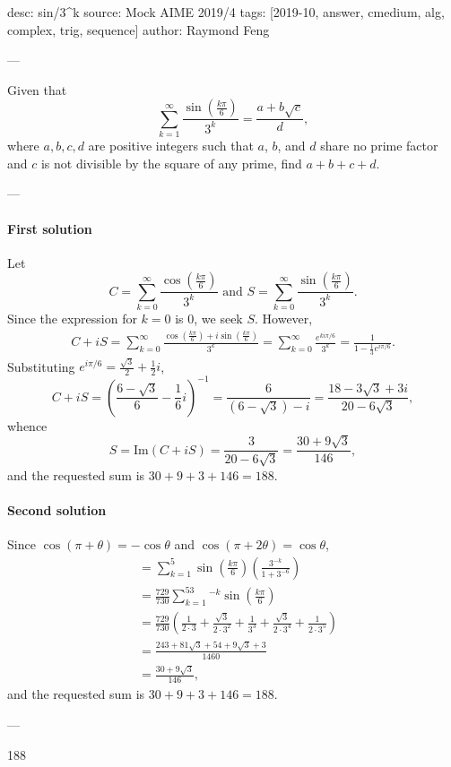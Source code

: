 desc: sin/3^k
source: Mock AIME 2019/4
tags: [2019-10, answer, cmedium, alg, complex, trig, sequence]
author: Raymond Feng

---

Given that \[\sum_{k=1}^\infty\frac{\sin(\frac{k\pi}6)}{3^k}=\frac{a+b\sqrt c}d,\]
where $a,b,c,d$ are positive integers such that $a$, $b$, and $d$ share no prime factor and $c$ is not divisible by the square of any prime, find $a+b+c+d$.

---

\paragraph{First solution}     Let \[C=\sum_{k=0}^\infty\frac{\cos(\frac{k\pi}6)}{3^k}\text{ and }S=\sum_{k=0}^\infty\frac{\sin(\frac{k\pi}6)}{3^k}.\]
Since the expression for $k=0$ is $0$, we seek $S$. However,
\begin{align*}
    C+iS=\sum_{k=0}^\infty\frac{\cos(\frac{k\pi}6)+i\sin(\frac{k\pi}6)}{3^k}=\sum_{k=0}^\infty\frac{e^{ki\pi/6}}{3^k}=\frac1{1-\frac13e^{i\pi/6}}.
\end{align*}
Substituting $e^{i\pi/6}=\tfrac{\sqrt3}2+\tfrac12i$, \[C+iS=\left(\frac{6-\sqrt3}6-\frac16i\right)^{-1}=\frac6{(6-\sqrt3)-i}=\frac{18-3\sqrt3+3i}{20-6\sqrt3},\]
whence \[S=\text{Im}(C+iS)=\frac3{20-6\sqrt3}=\frac{30+9\sqrt3}{146},\]
and the requested sum is $30+9+3+146=188$.

\paragraph{Second solution}     Since $\cos(\pi+\theta)=-\cos\theta$ and $\cos(\pi+2\theta)=\cos\theta$,
\begin{align*}
    &=\sum_{k=1}^5\sin\left(\frac{k\pi}6\right)\left(\frac{3^{-k}}{1+3^{-6}}\right)\\
    &=\frac{729}{730}\sum_{k=1}^53^{-k}\sin\left(\frac{k\pi}6\right)\\
    &=\frac{729}{730}\left(\frac1{2\cdot 3}+\frac{\sqrt3}{2\cdot 3^2}+\frac1{3^3}+\frac{\sqrt3}{2\cdot 3^4}+\frac1{2\cdot 3^5}\right)\\
    &=\frac{243+81\sqrt3+54+9\sqrt3+3}{1460}\\
    &=\frac{30+9\sqrt3}{146},
\end{align*}
and the requested sum is $30+9+3+146=188$.


---

188
